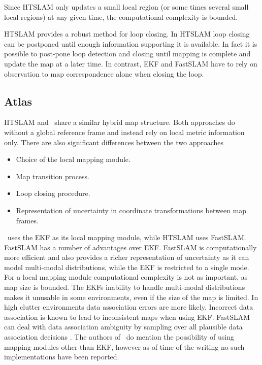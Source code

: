 Since HTSLAM only updates a small local region (or some times
several small local regions) at any given time, the computational
complexity is bounded.

HTSLAM provides a robust method for loop closing. In HTSLAM loop
closing can be postponed until enough information supporting it is
available. In fact it is possible to post-pone loop detection and
closing until mapping is complete and update the map at a later time. In
contrast, EKF and FastSLAM have to rely on observation to map
correspondence alone when closing the loop.


\subsection{Atlas}

HTSLAM and \Atlas\ share a similar hybrid map structure. Both approaches
do without a global reference frame and instead rely on local metric
information only. There are also significant differences between the
two approaches

\begin{itemize}
\item Choice of the local mapping module.
\item Map transition process.
\item Loop closing procedure.
\item Representation of uncertainty in coordinate transformations
  between map frames.
\end{itemize}

\Atlas\ uses the EKF as its local mapping module, while HTSLAM uses
FastSLAM. FastSLAM has a number of advantages over EKF. FastSLAM is
computationally more efficient and also provides a richer representation
of uncertainty as it can model multi-modal distributions, while the EKF
is restricted to a single mode. For a local mapping module computational
complexity is not as important, as map size is bounded. The EKFs
inability to handle multi-modal distributions makes it unusable in some
environments, even if the size of the map is limited.  In high clutter
environments data association errors are more likely. Incorrect data
association is known to lead to inconsistent maps when using
EKF. FastSLAM can deal with data association ambiguity by sampling over
all plausible data association decisions
\cite{fastslam,Montemerlo2003,nieto2003}. The authors of \Atlas\ do
mention the possibility of using mapping modules other than EKF, however
as of time of the writing no such implementations have been reported.

